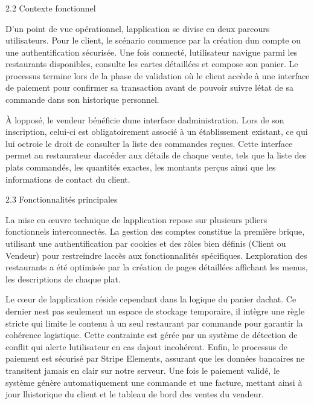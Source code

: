 \documentclass[
]{article}
\begin{document}
\subsubsection{}\label{section-2}

2.2 Contexte fonctionnel

D'un point de vue opérationnel, l\textquotesingle application se divise
en deux parcours utilisateurs. Pour le client, le scénario commence par
la création d\textquotesingle un compte ou une authentification
sécurisée. Une fois connecté, l\textquotesingle utilisateur navigue
parmi les restaurants disponibles, consulte les cartes détaillées et
compose son panier. Le processus termine lors de la phase de validation
où le client accède à une interface de paiement pour confirmer sa
transaction avant de pouvoir suivre l\textquotesingle état de sa
commande dans son historique personnel.

À l\textquotesingle opposé, le vendeur bénéficie d\textquotesingle une
interface d\textquotesingle administration. Lors de son inscription,
celui-ci est obligatoirement associé à un établissement existant, ce qui
lui octroie le droit de consulter la liste des commandes reçues. Cette
interface permet au restaurateur d\textquotesingle accéder aux détails
de chaque vente, tels que la liste des plats commandés, les quantités
exactes, les montants perçus ainsi que les informations de contact du
client.

2.3 Fonctionnalités principales

La mise en œuvre technique de l\textquotesingle application repose sur
plusieurs piliers fonctionnels interconnectés. La gestion des comptes
constitue la première brique, utilisant une authentification par cookies
et des rôles bien définis (Client ou Vendeur) pour restreindre
l\textquotesingle accès aux fonctionnalités spécifiques.
L\textquotesingle exploration des restaurants a été optimisée par la
création de pages détaillées affichant les menus, les descriptions de
chaque plat.

Le cœur de l\textquotesingle application réside cependant dans la
logique du panier d\textquotesingle achat. Ce dernier
n\textquotesingle est pas seulement un espace de stockage temporaire, il
intègre une règle stricte qui limite le contenu à un seul restaurant par
commande pour garantir la cohérence logistique. Cette contrainte est
gérée par un système de détection de conflit qui alerte
l\textquotesingle utilisateur en cas d\textquotesingle ajout incohérent.
Enfin, le processus de paiement est sécurisé par Stripe Elements,
assurant que les données bancaires ne transitent jamais en clair sur
notre serveur. Une fois le paiement validé, le système génère
automatiquement une commande et une facture, mettant ainsi à jour
l\textquotesingle historique du client et le tableau de bord des ventes
du vendeur.
\end{document}
